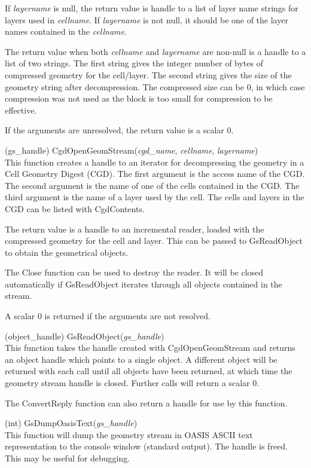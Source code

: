 \begin{description}
If {\it layername} is null, the return value is handle to a list of
layer name strings for layers used in {\it cellname}.  If {\it
layername} is not null, it should be one of the layer names contained
in the {\it cellname}.

The return value when both {\it cellname} and {\it layername} are
non-null is a handle to a list of two strings.  The first string gives
the integer number of bytes of compressed geometry for the cell/layer. 
The second string gives the size of the geometry string after
decompression.  The compressed size can be 0, in which case
compression was not used as the block is too small for compression to
be effective.

If the arguments are unresolved, the return value is a scalar 0.

\item{(gs\_handle) \vt CgdOpenGeomStream({\it cgd\_name\/},
 {\it cellname\/}, {\it layername\/})}\\
This function creates a handle to an iterator for decompressing the
geometry in a Cell Geometry Digest (CGD).  The first argument is the
access name of the CGD.  The second argument is the name of one of the
cells contained in the CGD.  The third argument is the name of a layer
used by the cell.  The cells and layers in the CGD can be listed with
{\vt CgdContents}.

The return value is a handle to an incremental reader, loaded with the
compressed geometry for the cell and layer.  This can be passed to
{\vt GsReadObject} to obtain the geometrical objects.

The {\vt Close} function can be used to destroy the reader.  It will
be closed automatically if\newline
{\vt GsReadObject} iterates through all objects contained in the
stream.

A scalar 0 is returned if the arguments are not resolved.

\item{(object\_handle) \vt GsReadObject({\it gs\_handle\/})}\\
This function takes the handle created with {\vt CgdOpenGeomStream}
and returns an object handle which points to a single object.  A
different object will be returned with each call until all objects
have been returned, at which time the geometry stream handle is
closed.  Further calls will return a scalar 0.

The {\vt ConvertReply} function can also return a handle for use by
this function.

\item{(int) \vt GsDumpOasisText({\it gs\_handle\/})}\\
This function will dump the geometry stream in OASIS ASCII text
representation to the console window (standard output).  The handle is
freed.  This may be useful for debugging.

\end{description}


